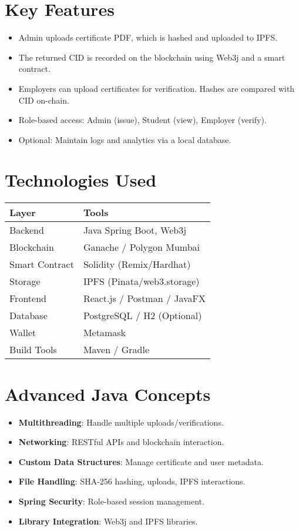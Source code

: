 \documentclass[12pt]{article}
\begin{document}
\section*{Key Features}
\begin{itemize}
  \item Admin uploads certificate PDF, which is hashed and uploaded to IPFS.
  \item The returned CID is recorded on the blockchain using Web3j and a smart contract.
  \item Employers can upload certificates for verification. Hashes are compared with CID on-chain.
  \item Role-based access: Admin (issue), Student (view), Employer (verify).
  \item Optional: Maintain logs and analytics via a local database.
\end{itemize}

\section*{Technologies Used}
\begin{tabular}{|l|l|}
\hline
\textbf{Layer} & \textbf{Tools} \\
\hline
Backend & Java Spring Boot, Web3j \\
Blockchain & Ganache / Polygon Mumbai \\
Smart Contract & Solidity (Remix/Hardhat) \\
Storage & IPFS (Pinata/web3.storage) \\
Frontend & React.js / Postman / JavaFX \\
Database & PostgreSQL / H2 (Optional) \\
Wallet & Metamask \\
Build Tools & Maven / Gradle \\
\hline
\end{tabular}

\section*{Advanced Java Concepts}
\begin{itemize}
  \item \textbf{Multithreading}: Handle multiple uploads/verifications.
  \item \textbf{Networking}: RESTful APIs and blockchain interaction.
  \item \textbf{Custom Data Structures}: Manage certificate and user metadata.
  \item \textbf{File Handling}: SHA-256 hashing, uploads, IPFS interactions.
  \item \textbf{Spring Security}: Role-based session management.
  \item \textbf{Library Integration}: Web3j and IPFS libraries.
\end{itemize}
\end{document}
